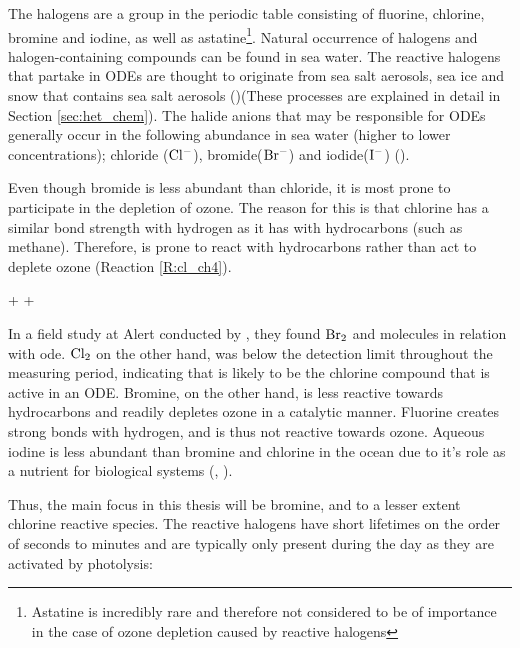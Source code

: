 The halogens are a group in the periodic table consisting of fluorine, chlorine, bromine and iodine, as well as astatine\footnote{Astatine is incredibly rare and therefore not considered to be of importance in the case of ozone depletion caused by reactive halogens}. Natural occurrence of halogens and halogen-containing compounds can be found in sea water. The reactive halogens that partake in ODEs  are thought to originate from sea salt aerosols, sea ice and snow that contains sea salt aerosols (\cite{Foster2001})(These processes are explained in detail in Section \ref{sec:het_chem}). The halide anions that may be responsible for ODEs generally occur in the following abundance in sea water (higher to lower concentrations); chloride ($\mathrm{Cl^-}$), bromide($\mathrm{Br^-}$) and iodide($\mathrm{I^-}$) (\cite{Simpson2015}). 

\medskip

Even though bromide is less abundant than chloride, it is most prone to participate in the depletion of ozone. The reason for this is that chlorine has a similar bond strength with hydrogen as it has with hydrocarbons (such as methane). Therefore,  is prone to react with hydrocarbons rather than act to deplete ozone (Reaction \ref{R:cl_ch4}).

\begin{reaction}
     +  \rightarrow {} + 
    \label{R:cl_ch4}
\end{reaction}

In a field study at Alert conducted by \cite{Foster2001}, they found $\mathrm{Br_2}$ and  molecules in relation with \acrshort{ode}. $\mathrm{Cl_2}$ on the other hand, was below the detection limit throughout the measuring period, indicating that  is likely to be the chlorine compound that is active in an ODE. Bromine, on the other hand, is less reactive towards hydrocarbons and readily depletes ozone in a catalytic manner.  Fluorine creates strong bonds with hydrogen, and is thus not reactive towards ozone. Aqueous iodine is less abundant than bromine and chlorine in the ocean due to it's role as a nutrient for biological systems (\cite{FinlaysonPitts2010}, \cite{Simpson2015}). 

\medskip

Thus, the main focus in this thesis will be bromine, and to a lesser extent chlorine reactive species. The reactive halogens have short lifetimes on the order of seconds to minutes and are typically only present during the day as they are activated by photolysis:

